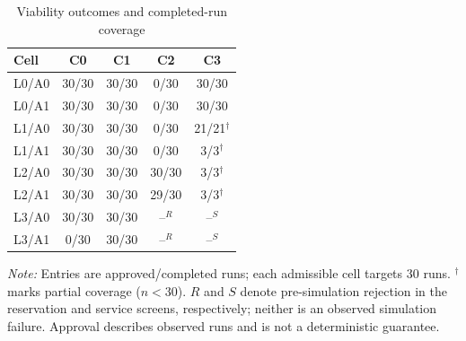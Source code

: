 \begin{table}[t]
\centering
\caption{Viability outcomes and completed-run coverage}
\label{tab:viability}
\footnotesize
\setlength{\tabcolsep}{3.5pt}
\begin{tabular}{@{}lcccc@{}}
\toprule
Cell & C0 & C1 & C2 & C3 \\
\midrule
L0/A0 & 30/30 & 30/30 & 0/30 & 30/30 \\
L0/A1 & 30/30 & 30/30 & 0/30 & 30/30 \\
L1/A0 & 30/30 & 30/30 & 0/30 & 21/21$^{\dagger}$ \\
L1/A1 & 30/30 & 30/30 & 0/30 & 3/3$^{\dagger}$ \\
L2/A0 & 30/30 & 30/30 & 30/30 & 3/3$^{\dagger}$ \\
L2/A1 & 30/30 & 30/30 & 29/30 & 3/3$^{\dagger}$ \\
L3/A0 & 30/30 & 30/30 & --$^{R}$ & --$^{S}$ \\
L3/A1 & 0/30 & 30/30 & --$^{R}$ & --$^{S}$ \\
\bottomrule
\end{tabular}
\par\vspace{2pt}
\begin{minipage}{\columnwidth}\footnotesize
\textit{Note:} Entries are approved/completed runs; each admissible cell targets 30 runs. $^{\dagger}$ marks partial coverage ($n<30$). $R$ and $S$ denote pre-simulation rejection in the reservation and service screens, respectively; neither is an observed simulation failure. Approval describes observed runs and is not a deterministic guarantee.
\end{minipage}
\end{table}
